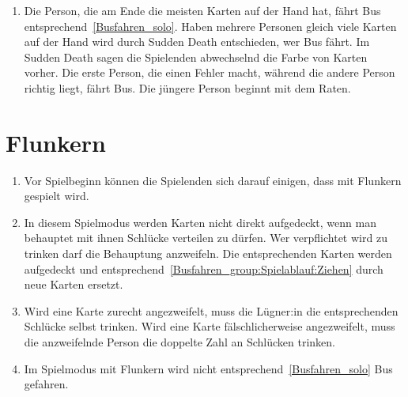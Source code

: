 \begin{enumerate}[label={(\arabic*)}]
\item
Die Person, die am Ende die meisten Karten auf der Hand hat, fährt Bus entsprechend~\ref{Busfahren_solo}.
Haben mehrere Personen gleich viele Karten auf der Hand wird durch Sudden Death entschieden, wer Bus fährt.
Im Sudden Death sagen die Spielenden abwechselnd die Farbe von Karten vorher.
Die erste Person, die einen Fehler macht, während die andere Person richtig liegt, fährt Bus.
Die jüngere Person beginnt mit dem Raten.
\end{enumerate}

\chapter{Flunkern}
\begin{enumerate}[label={(\arabic*)}]
\item
Vor Spielbeginn können die Spielenden sich darauf einigen, dass mit Flunkern gespielt wird.

\item
In diesem Spielmodus werden Karten nicht direkt aufgedeckt, wenn man behauptet mit ihnen Schlücke verteilen zu dürfen.
Wer verpflichtet wird zu trinken darf die Behauptung anzweifeln.
Die entsprechenden Karten werden aufgedeckt und entsprechend~\ref{Busfahren_group:Spielablauf:Ziehen} durch neue Karten ersetzt.

\item
Wird eine Karte zurecht angezweifelt, muss die Lügner:in die entsprechenden Schlücke selbst trinken.
Wird eine Karte fälschlicherweise angezweifelt, muss die anzweifelnde Person die doppelte Zahl an Schlücken trinken.

\item
Im Spielmodus mit Flunkern wird nicht entsprechend~\ref{Busfahren_solo} Bus gefahren.
\end{enumerate}
